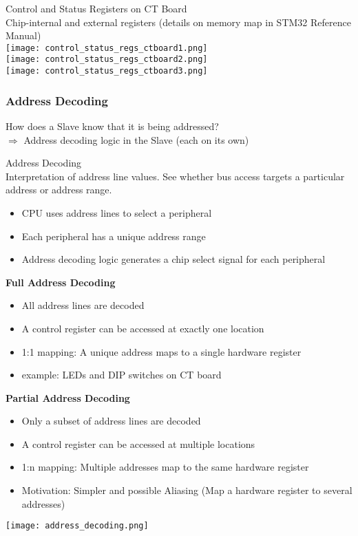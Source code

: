 \begin{theorem}{Control and Status Registers on CT Board}\\
    Chip-internal and external registers (details on memory map in STM32 Reference Manual)\\
    \texttt{[image: control\_status\_regs\_ctboard1.png]}\\
    \texttt{[image: control\_status\_regs\_ctboard2.png]}\\
    \texttt{[image: control\_status\_regs\_ctboard3.png]}
\end{theorem}

\subsubsection{Address Decoding}

\begin{remark}
    How does a Slave know that it is being addressed?\\
    $\Rightarrow$ Address decoding logic in the Slave (each on its own)
\end{remark}

\begin{definition}{Address Decoding}\\
    Interpretation of address line values. See whether bus access targets a particular address or address range.
    \begin{itemize}
        \item CPU uses address lines to select a peripheral
        \item Each peripheral has a unique address range
        \item Address decoding logic generates a chip select signal for each peripheral
    \end{itemize}

    \textbf{Full Address Decoding}
    \begin{itemize}
        \item All address lines are decoded
        \item A control register can be accessed at exactly one location
        \item 1:1 mapping: A unique address maps to a single hardware register
        \item example: LEDs and DIP switches on CT board
    \end{itemize}

    \textbf{Partial Address Decoding}
    \begin{itemize}
        \item Only a subset of address lines are decoded
        \item A control register can be accessed at multiple locations
        \item 1:n mapping: Multiple addresses map to the same hardware register
        \item Motivation: Simpler and possible Aliasing (Map a hardware register to several addresses)
    \end{itemize}
    \texttt{[image: address\_decoding.png]}
\end{definition}


